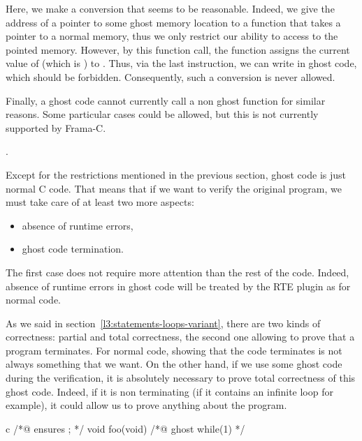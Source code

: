 

Here, we make a conversion that seems to be reasonable. Indeed, we give
the address of a pointer to some ghost memory location to a function
that takes a pointer to a normal memory, thus we only restrict our ability
to access to the pointed memory. However, by this function call, the function
 assigns the current value of  (which is
) to . Thus, via the last instruction, we
can write  in ghost code, which should be forbidden.
Consequently, such a conversion is never allowed.


Finally, a ghost code cannot currently call a non ghost function for
similar reasons. Some particular cases could be allowed, but this is
not currently supported by Frama-C.


\label{l3:acsl-logic-definitions-what-remains}.


Except for the restrictions mentioned in the previous section,
ghost code is just normal C code. That means that if we want to
verify the original program, we must take care of at least two more
aspects:


\begin{itemize}
\item absence of runtime errors,
\item ghost code termination.
\end{itemize}


The first case does not require more attention than the rest of the
code. Indeed, absence of runtime errors in ghost code will be treated
by the RTE plugin as for normal code.


As we said in section~\ref{l3:statements-loops-variant}, there are two
kinds of correctness: partial and total correctness, the second one allowing
to prove that a program terminates. For normal code, showing that the code
terminates is not always something that we want. On the other hand, if we
use some ghost code during the verification, it is absolutely necessary to
prove total correctness of this ghost code. Indeed, if it is non terminating
(if it contains an infinite loop for example), it could allow us to prove
anything about the program.


\begin{CodeBlock}{c}
/*@ ensures \false ; */
void foo(void){
  /*@ ghost
    while(1){}
  */
}
\end{CodeBlock}




